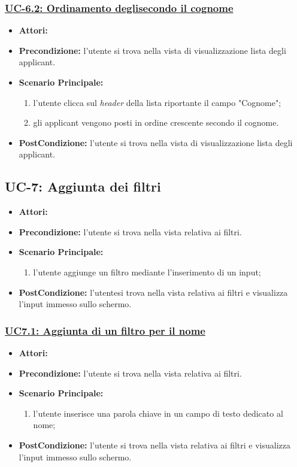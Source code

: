 \subsubsection{\underline{UC-6.2: Ordinamento degli\applicant secondo il cognome}}
\begin{itemize}
	\item \textbf{Attori:}\loggedusr
	\item \textbf{Precondizione:} l'utente si trova nella vista di visualizzazione lista degli applicant.
	\item \textbf{Scenario Principale:}
	\begin{enumerate}
		\item l'utente clicca sul \textit{header} della lista riportante il campo "Cognome";
		\item gli applicant vengono posti in ordine crescente secondo il cognome.
	\end{enumerate}
	\item \textbf{PostCondizione:}  l'utente si trova nella vista di visualizzazione lista degli applicant.
\end{itemize}

\subsection{UC-7: Aggiunta dei filtri}
\begin{itemize}
\item \textbf{Attori:}\loggedusr
\item \textbf{Precondizione:} l'utente si trova nella vista relativa ai filtri.
\item \textbf{Scenario Principale:}
\begin{enumerate}
	\item l'utente aggiunge un filtro mediante l'inserimento di un input;
\end{enumerate}
\item \textbf{PostCondizione:} l'utentesi trova nella vista relativa ai filtri e visualizza l'input immesso sullo schermo.
\end{itemize}

\subsubsection{\underline{UC7.1: Aggiunta di un filtro per il nome}}
\begin{itemize}
\item \textbf{Attori:}\loggedusr
\item \textbf{Precondizione:} l'utente si trova nella vista relativa ai filtri.
\item \textbf{Scenario Principale:}
\begin{enumerate}
	\item l'utente inserisce una parola chiave in un campo di testo dedicato al nome;
\end{enumerate}
\item \textbf{PostCondizione:}  l'utente si trova nella vista relativa ai filtri e visualizza l'input immesso sullo schermo.
\end{itemize}

